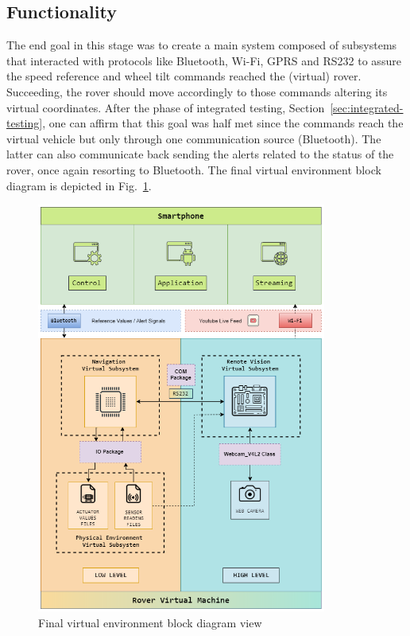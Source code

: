 \subsection{Functionality}%
\label{functionality-verif}
%
The end goal in this stage was to create a main system composed of subsystems
that interacted with protocols like Bluetooth, Wi-Fi, GPRS and RS232 to assure
the speed reference and wheel tilt commands reached the (virtual)
rover. Succeeding, the rover should move accordingly to those commands altering
its virtual coordinates.
After the phase of integrated testing, Section~\ref{sec:integrated-testing}, one can affirm that this goal was half met since the commands reach the virtual vehicle but only through one communication source (Bluetooth). The latter can also communicate back sending the alerts related to the status of the rover, once again resorting to Bluetooth. The final  
virtual environment block diagram is depicted in Fig.~\ref{fig:final-diagram}.
%
\begin{figure}[!ht]
\centering
\includegraphics[width=0.85\textwidth]{img/functionality.png}
\caption{\label{fig:final-diagram}Final  
virtual environment block diagram view}
\end{figure}
%
